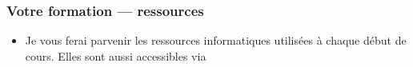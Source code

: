 
\begin{frame}
  \frametitle{Votre formation — ressources}
  \begin{itemize}
    \item Je vous ferai parvenir les ressources informatiques utilisées à chaque début de cours. Elles sont aussi accessibles via 
  \end{itemize}
\end{frame}
